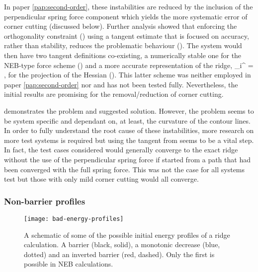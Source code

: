 In paper \ref{pap:second-order}, these instabilities are reduced by the inclusion of the perpendicular spring force component which yields the more systematic error of corner cutting (discussed below).
Further analysis showed that enforcing the orthogonality constraint () using a tangent estimate that is focused on accuracy, rather than stability, reduces the problematic behaviour ().
The system would then have two tangent definitions co-existing, a numerically stable one for the NEB-type force scheme () and a more accurate representation of the ridge,
\uvt_i^ = ,
\eeq
for the projection of the Hessian ().
This latter scheme was neither employed in paper \ref{pap:second-order} nor  and has not been tested fully.
Nevertheless, the initial results are promising for the removal/reduction of corner cutting.

 demonstrates the problem and suggested solution.
However, the problem seems to be system specific and dependant on, at least, the curvature of the contour lines.
In order to fully understand the root cause of these instabilities, more research on more test systems is required but using the tangent from  seems to be a vital step.
In fact, the test cases considered would generally converge to the exact ridge without the use of the perpendicular spring force if started from a path that had been converged with the full spring force.
This was not the case for all systems test but those with only mild corner cutting would all converge.

\subsubsection{Non-barrier profiles}
\begin{SCfigure}[10][htb!]
\centering
    \texttt{[image: bad-energy-profiles]}
\caption{A schematic of some of the possible initial energy profiles of a ridge calculation.
A barrier (black, solid), a monotonic decrease (blue, dotted) and an inverted barrier (red, dashed).
Only the first is possible in NEB calculations.
}
\label{fig:bad-energy-profiles}
\end{SCfigure}

